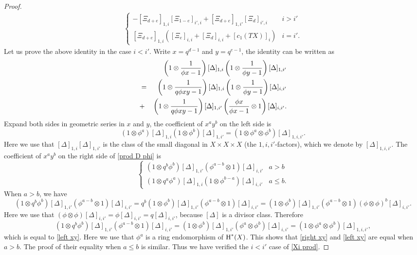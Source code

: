 \documentclass[reqno]{amsart}
\numberwithin{equation}{subsection}
\theoremstyle{definition}
\newcommand\ot{\otimes}
\newcommand{\cohog}[2]{\textup{H}^{#1}({#2})}     %
\newcommand\D\Delta
\begin{document}
\begin{proof}
\begin{eqnarray}
\begin{cases}
            -[\Xi_{d+e}]_{1,i}[\Xi_{1-e}]_{i',i}+[\Xi_{d+e}]_{1,i'}[\Xi_d]_{i',i}& i>i'\\
            [\Xi_{d+e}]_{1,i}\left([\Xi_e]_{i,i}+[\Xi_d]_{i,i}+[c_1(TX)]_i\right) & i=i'.
        \end{cases}
    \end{eqnarray}
    Let us prove the above identity in the case $i<i'$. Write $x=q^{d-1}$ and $y=q^{e-1}$, the identity can be written as
    \begin{eqnarray}\label{prod D phi}
        &&\left(1\ot \frac{1}{\phi x-1}\right)[\D]_{1,i}\left(1\ot \frac{1}{\phi y-1}\right)[\D]_{1,i'}\\
\notag        &=& \left(1\ot \frac{1}{q\phi xy-1}\right)[\D]_{1,i}\left(1\ot \frac{1}{\phi y-1}\right)[\D]_{i,i'}\\
\notag        &+&\left(1\ot \frac{1}{q\phi xy-1}\right)[\D]_{1,i'}\left(\frac{\phi x}{\phi x-1}\ot1\right)[\D]_{i,i'}.
    \end{eqnarray}
    Expand both sides in geometric series in $x$ and $y$, the coefficient of $x^ay^b$ on the left side is 
    \begin{equation}\label{left xy}
        (1\ot \phi^a)[\D]_{1,i}(1\ot \phi^b)[\D]_{1,i'}=(1\ot \phi^a\ot \phi^b)[\D]_{1,i,i'}.
    \end{equation}
    Here we use that $[\D]_{1,i}[\D]_{1,i'}$ is the class of the small diagonal in $X\times X\times X$ (the $1,i,i'$-factors), which we denote by $[\D]_{1,i,i'}$. The coefficient of $x^ay^b$ on the right side of \eqref{prod D phi} is
    \begin{equation}\label{right xy}
        \begin{cases}
            (1\ot q^b\phi^b)[\D]_{1,i'}(\phi^{a-b}\ot1)[\D]_{i,i'}& a>b\\
            (1\ot q^a\phi^a)[\D]_{1,i}(1\ot \phi^{b-a})[\D]_{i,i'}  & a\le b.
        \end{cases}
    \end{equation}
    When $a>b$, we have
    \begin{equation*}
        (1\ot q^b\phi^b)[\D]_{1,i'}(\phi^{a-b}\ot1)[\D]_{i,i'}=q^b(1\ot \phi^b)[\D]_{1,i'}(\phi^{a-b}\ot1)[\D]_{i,i'}=(1\ot \phi^b)[\D]_{1,i'}(\phi^{a-b}\ot1)(\phi\ot \phi)^b[\D]_{i,i'}.
    \end{equation*}
    Here we use that $(\phi\ot\phi)[\D]_{i,i'}=\phi[\D]_{i,i'}=q[\D]_{i,i'}$, because $[\D]$ is a divisor class. Therefore
    \begin{equation*}
        (1\ot q^b\phi^b)[\D]_{1,i'}(\phi^{a-b}\ot1)[\D]_{i,i'}=(1\ot \phi^b)[\D]_{1,i'}(\phi^a\ot \phi^{b})[\D]_{i,i'}=(1\ot \phi^a\ot \phi^b)[\D]_{1,i,i'},
    \end{equation*}
    which is equal to \eqref{left xy}.
    Here we use that $\phi^a$ is a ring endomorphism of $\cohog{*}{X}$. This shows that \eqref{right xy} and \eqref{left xy} are equal when $a>b$. The proof of their equality when $a\le b$ is similar. Thus we have verified the $i<i'$ case of \eqref{Xi prod}.


\end{proof}
\end{document}
